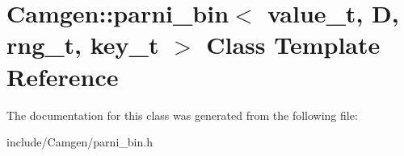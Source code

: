 \hypertarget{a00390}{}\section{Camgen\+:\+:parni\+\_\+bin$<$ value\+\_\+t, D, rng\+\_\+t, key\+\_\+t $>$ Class Template Reference}
\label{a00390}


The documentation for this class was generated from the following file\+:\begin{DoxyCompactItemize}
\item 
include/\+Camgen/parni\+\_\+bin.\+h\end{DoxyCompactItemize}
